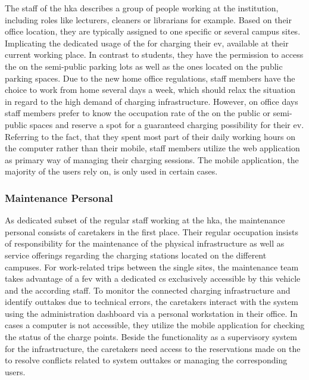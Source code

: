 The staff of the \acrshort{hka} describes a group of people working at the institution, including roles like lecturers, cleaners or librarians for example.
Based on their office location, they are typically assigned to one specific or several campus sites. Implicating the dedicated usage of the  for charging their \acrshort{ev}, available at their current working place.
In contrast to students, they have the permission to access the  on the semi-public parking lots as well as the ones located on the public parking spaces. 
Due to the new home office regulations, staff members have the choice to work from home several days a week, which should relax the situation in regard to the high demand of charging infrastructure.
However, on office days staff members prefer to know the occupation rate of the  on the public or semi-public spaces and reserve a spot for a guaranteed charging possibility for their \acrshort{ev}.
Referring to the fact, that they spent most part of their daily working hours on the computer rather than their mobile, staff members utilize the web application as primary way of managing their charging sessions.
The mobile application, the majority of the users rely on, is only used in certain cases.

\subsubsection{Maintenance Personal}
\label{ch:Requirements Engineering:sec:Stakeholders:ssec:Staff:sssec:Maintenance Personal}

As dedicated subset of the regular staff working at the \acrshort{hka}, the maintenance personal consists of caretakers in the first place. Their regular occupation insists of responsibility for the maintenance of the physical infrastructure as well as service offerings regarding the charging stations located on the different campuses.
For work-related trips between the single sites, the maintenance team takes advantage of a \acrshort{fev} with a dedicated \acrshort{cs} exclusively accessible by this vehicle and the according staff.
To monitor the connected charging infrastructure and identify outtakes due to technical errors, the caretakers interact with the system using the administration dashboard via a personal workstation in their office. In cases a computer is not accessible, they utilize the mobile application for checking the status of the charge points.
Beside the functionality as a supervisory system for the infrastructure, the caretakers need access to the reservations made on the  to resolve conflicts related to system outtakes or managing the corresponding users.

